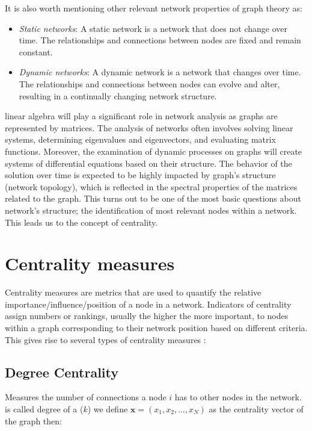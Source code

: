 It is also worth mentioning other relevant network properties of graph theory as:

\begin{itemize}
  \item \textit{Static networks}: A static network is a network that does not change over time. The relationships and connections between nodes are fixed and remain constant. 
  \item \textit{Dynamic networks}: A dynamic network is a network that changes over time. The relationships and connections between nodes can evolve and alter, resulting in a continually changing network structure.
\end{itemize}

 linear algebra will play a significant role in network analysis as graphs are represented by matrices. The analysis of networks often involves solving linear systems, determining eigenvalues and eigenvectors, and evaluating matrix functions. Moreover, the examination of dynamic processes on graphs will create systems of differential equations based on their structure. The behavior of the solution over time is expected to be highly impacted by  graph's structure (network topology), which is reflected in the spectral properties of the matrices related to the graph. This turns out to be one of the most basic questions about  network's structure; the identification of most relevant nodes within a network. This leads us to the concept of centrality.

\section{Centrality measures}
\label{sec:centra}
 Centrality measures are metrics that are used to quantify the relative importance/influence/position of a node in a network. Indicators of centrality assign numbers or rankings, usually the higher the more important, to nodes within a graph corresponding to their network position based on different criteria. This gives rise to several types of centrality measures \cite{newman2018networks}:

\subsection*{Degree Centrality}  Measures the number of connections a node $i$ has to other nodes in the network.  is called  degree of a  ($k$) we define $\mathbf{x}=(x_1,x_2,\dots,x_N)$ as the centrality vector of the graph then: 

